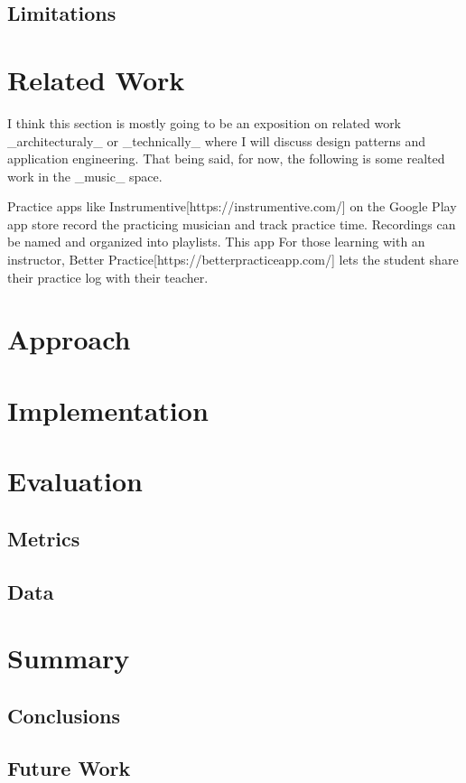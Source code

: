 \documentclass{article}
\begin{document}
\subsection{Limitations}


\section{Related Work}

I think this section is mostly going to be an exposition on related work \_architecturaly\_ or \_technically\_ where I will discuss design patterns and application engineering.
That being said, for now, the following is some realted work in the \_music\_ space.

Practice apps like Instrumentive[https://instrumentive.com/] on the Google Play app store record the practicing musician and track practice time.
Recordings can be named and organized into playlists.
This app 
For those learning with an instructor, Better Practice[https://betterpracticeapp.com/] lets the student share their practice log with their teacher.


\section{Approach} 
\section{Implementation}
\section{Evaluation}
\subsection{Metrics}
\subsection{Data}
\section{Summary}
\subsection{Conclusions}
\subsection{Future Work}
\end{document}
